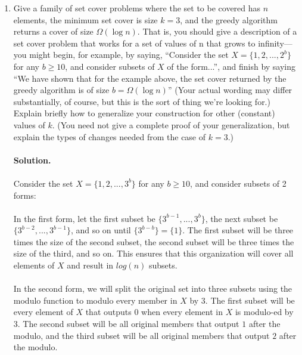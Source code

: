 \documentclass[11pt]{article}
\newcommand\solution{%
  \textbf{Solution.}\\%
}
\begin{document}
\begin{enumerate}
\item 
Give a family of set cover problems where the set to be covered has $n$ elements, the minimum set cover is size $k = 3$, and the greedy algorithm returns a cover of size $\Omega(\log{n})$. That is, you should give a description of a set cover problem that works for a set of values of n that grows to infinity---you might begin, for example, by saying, “Consider the set $X = \{1,2,...,2^b\}$ for any $b \geq 10$, and consider subsets of $X$ of the form...”, and finish by saying “We have shown that for the example above, the set cover returned by the greedy algorithm is of size $b = \Omega(\log{n})$” (Your actual wording may differ substantially, of course, but this is the sort of thing we’re looking for.) Explain briefly how to generalize your construction for other (constant) values of $k$. (You need not give a complete proof of your generalization, but explain the types of changes needed from the case of $k = 3$.) \\\\
\solution \\
Consider the set $X = \{1,2,...,3^b\}$ for any $b \geq 10$, and consider subsets of 2 forms: \\
\\
In the first form, let the first subset be $\{3^{b-1}, ..., 3^b\}$, the next subset be $\{3^{b-2}, ..., 3^{b-1}\}$, and so on until $\{3^{b-b}\} = \{1\}$. The first subset will be three times the size of the second subset, the second subset will be three times the size of the third, and so on. This ensures that this organization will cover all elements of $X$ and result in $log(n)$ subsets.\\
\\
In the second form, we will split the original set into three subsets using the modulo function to modulo every member in $X$ by $3$. The first subset will be every element of $X$ that outputs $0$ when every element in $X$ is modulo-ed by $3$. The second subset will be all original members that output $1$ after the modulo, and the third subset will be all original members that output $2$ after the modulo. \\
\\

\end{enumerate}
\end{document}
